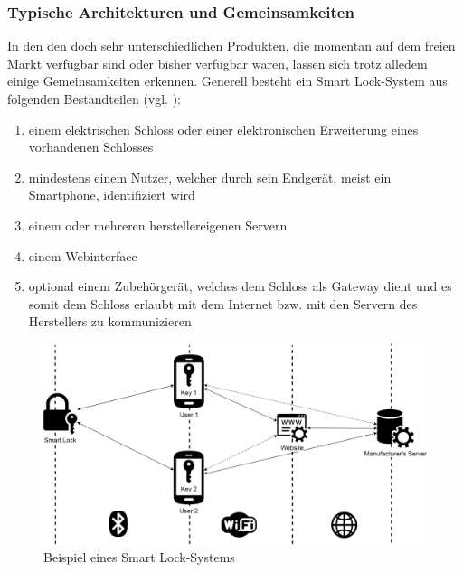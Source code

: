 	\subsubsection{Typische Architekturen und Gemeinsamkeiten}
	\label{sec:sota_smart_locks_arch}
	    In den den doch sehr unterschiedlichen Produkten, die momentan auf dem freien Markt verfügbar sind oder bisher verfügbar waren, lassen sich trotz alledem einige Gemeinsamkeiten erkennen\cite{Ye2017,Fuller2017}. 
    	\noindent Generell besteht ein Smart Lock-System aus folgenden Bestandteilen (vgl. ):
    	\begin{enumerate}[noitemsep]
    		\item einem elektrischen Schloss oder einer elektronischen Erweiterung eines vorhandenen Schlosses
    		\item mindestens einem Nutzer, welcher durch sein Endgerät, meist ein Smartphone, identifiziert wird
    		\item einem oder mehreren herstellereigenen Servern
    		\item einem Webinterface
    		\item optional einem Zubehörgerät, welches dem Schloss als Gateway dient und es somit dem Schloss erlaubt mit dem Internet bzw. mit den Servern des Herstellers zu kommunizieren
    	\end{enumerate}
    
    	\begin{figure}[H]
			\centering
			\includegraphics[width=\textwidth]{graphics/sl_arch.png}
			\caption[Beispiel eines Smart Lock-Systems]{Beispiel eines Smart Lock-Systems}
			\label{fig:sl_arch}
		\end{figure}
    	
